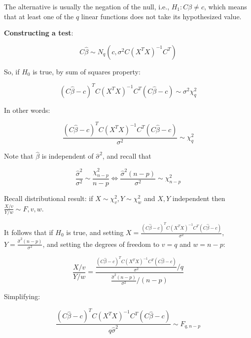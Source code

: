 \documentclass[10pt,landscape]{article}
\begin{document}
\begin{multicols}{3}
The alternative is usually the negation of the null, i.e., $H_1: C\beta\neq c$, which means that at least one of the $q$ linear functions does not take its hypothesized value. 

\textbf{Constructing a test}:

\begin{equation}
C\hat{\beta} \sim N_q (c,\sigma^2 C (X^T X)^{-1} C^T)
\end{equation}

So, if $H_0$ is true, by sum of squares property:

\begin{equation}
(C\hat{\beta} - c)^T C (X^T X)^{-1} C^T (C\hat{\beta} - c) \sim \sigma^2 \chi_q^2
\end{equation}

In other words:

\begin{equation}
\frac{(C\hat{\beta} - c)^T C (X^T X)^{-1} C^T (C\hat{\beta} - c)}{ \sigma^2} \sim \chi_q^2
\end{equation}

Note that $\hat{\beta}$ is independent of $\hat{\sigma}^2$, and recall that

\begin{equation}
\frac{\hat{\sigma}^2 }{\sigma^2} \sim \frac{\chi_{n-p}^2}{n-p}  \Leftrightarrow 
\frac{\hat{\sigma}^2 (n-p)}{\sigma^2} \sim \chi_{n-p}^2
\end{equation} 

Recall distributional result: if $X\sim \chi_v^2, Y\sim \chi_w^2$ and $X,Y$ independent then $\frac{X/v}{Y/w}\sim F,v,w$.  


It follows that if $H_0$ is true,  and setting
$X=\frac{(C\hat{\beta} - c)^T C (X^T X)^{-1} C^T (C\hat{\beta} - c)}{ \sigma^2}$,
$Y=\frac{\hat{\sigma}^2 (n-p)}{\sigma^2}$, and setting the degrees of freedom to $v=q$ and $w=n-p$:

\begin{equation}
\frac{X/v}{Y/w}=
\frac{\frac{(C\hat{\beta} - c)^T C (X^T X)^{-1} C^T (C\hat{\beta} - c)}{ \sigma^2}/q}{\frac{\hat{\sigma}^2 (n-p)}{\sigma^2}/(n-p)}
\end{equation}

Simplifying:

\begin{equation}
\frac{(C\hat{\beta} - c)^T C (X^T X)^{-1} C^T (C\hat{\beta} - c)}{q\hat{\sigma}^2} \sim F_{q,n-p}
\end{equation}



\end{multicols}
\end{document}
